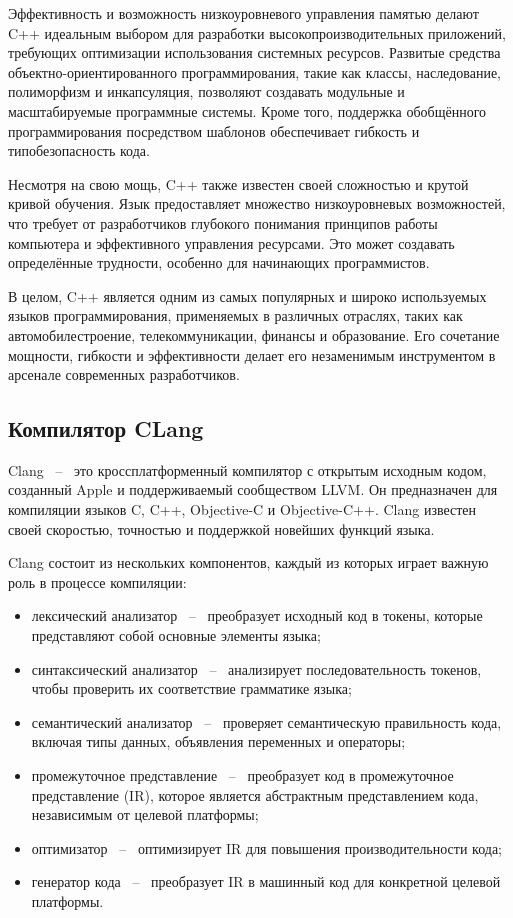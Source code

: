 Эффективность и возможность низкоуровневого управления памятью делают C++ идеальным выбором для разработки высокопроизводительных приложений, требующих оптимизации использования системных ресурсов. Развитые средства объектно-ориентированного программирования, такие как классы, наследование, полиморфизм и инкапсуляция, позволяют создавать модульные и масштабируемые программные системы. Кроме того, поддержка обобщённого программирования посредством шаблонов обеспечивает гибкость и типобезопасность кода.

Несмотря на свою мощь, C++ также известен своей сложностью и крутой кривой обучения. Язык предоставляет множество низкоуровневых возможностей, что требует от разработчиков глубокого понимания принципов работы компьютера и эффективного управления ресурсами. Это может создавать определённые трудности, особенно для начинающих программистов.

В целом, C++ является одним из самых популярных и широко используемых языков программирования, применяемых в различных отраслях, таких как автомобилестроение, телекоммуникации, финансы и образование. Его сочетание мощности, гибкости и эффективности делает его незаменимым инструментом в арсенале современных разработчиков.

\subsection{Компилятор CLang}

Clang ~--~ это кроссплатформенный компилятор с открытым исходным кодом, созданный Apple и поддерживаемый 
сообществом LLVM. Он предназначен для компиляции языков C, C++, Objective-C и Objective-C++. 
Clang известен своей скоростью, точностью и поддержкой новейших функций языка.

Clang состоит из нескольких компонентов, каждый из которых играет важную роль в процессе компиляции:

\begin{itemize}
    \item лексический анализатор ~--~ преобразует исходный код в токены, которые представляют собой основные элементы языка;
    \item синтаксический анализатор ~--~ анализирует последовательность токенов, чтобы проверить их соответствие грамматике языка;
    \item семантический анализатор ~--~ проверяет семантическую правильность кода, включая типы данных, объявления переменных и операторы;
    \item промежуточное представление ~--~ преобразует код в промежуточное представление (IR), которое является абстрактным представлением кода, независимым от целевой платформы;
    \item оптимизатор ~--~ оптимизирует IR для повышения производительности кода;
    \item генератор кода ~--~ преобразует IR в машинный код для конкретной целевой платформы.
\end{itemize}

